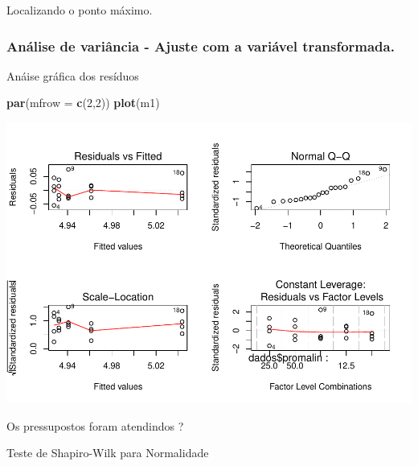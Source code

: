 \documentclass[
]{book}
\newenvironment{Shaded}{\begin{snugshade}}{\end{snugshade}}
\newcommand{\DataTypeTok}[1]{\textcolor[rgb]{0.13,0.29,0.53}{#1}}
\newcommand{\DecValTok}[1]{\textcolor[rgb]{0.00,0.00,0.81}{#1}}
\newcommand{\KeywordTok}[1]{\textcolor[rgb]{0.13,0.29,0.53}{\textbf{#1}}}
\newcommand{\NormalTok}[1]{#1}
\newcommand{\OperatorTok}[1]{\textcolor[rgb]{0.81,0.36,0.00}{\textbf{#1}}}
\newcommand{\StringTok}[1]{\textcolor[rgb]{0.31,0.60,0.02}{#1}}
\begin{document}
Localizando o ponto máximo.

\hypertarget{anuxe1lise-de-variuxe2ncia---ajuste-com-a-variuxe1vel-transformada.}{%
\subsubsection{Análise de variância - Ajuste com a variável transformada.}\label{anuxe1lise-de-variuxe2ncia---ajuste-com-a-variuxe1vel-transformada.}}

\begin{Shaded}
\end{Shaded}

Anáise gráfica dos resíduos

\begin{Shaded}
\begin{Highlighting}[]
\KeywordTok{par}\NormalTok{(}\DataTypeTok{mfrow =} \KeywordTok{c}\NormalTok{(}\DecValTok{2}\NormalTok{,}\DecValTok{2}\NormalTok{))}
\KeywordTok{plot}\NormalTok{(m1)}
\end{Highlighting}
\end{Shaded}

\includegraphics{TudodoR_files/figure-latex/unnamed-chunk-294-1.pdf}

Os pressupostos foram atendindos ?

Teste de Shapiro-Wilk para Normalidade
\end{document}
